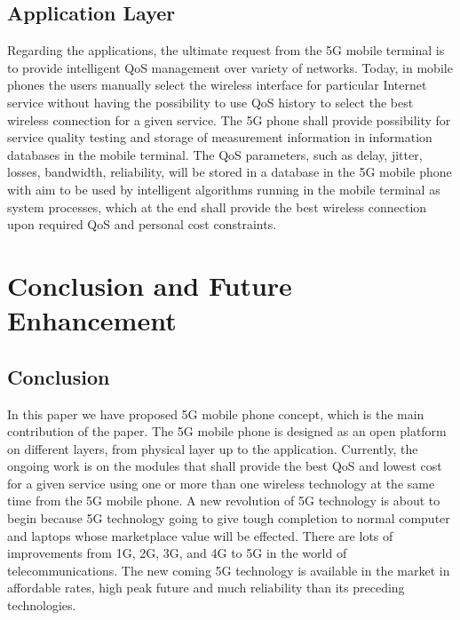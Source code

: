 \documentclass[conference]{IEEEtran}
\begin{document}
\subsection{Application Layer}
     Regarding the applications, the ultimate request from the 5G mobile terminal is to provide intelligent QoS management over variety of networks. Today, in mobile phones the users manually select the wireless interface for particular Internet service without having the possibility to use QoS history to select the best wireless connection for a given service. The 5G phone shall provide possibility for service quality testing and storage of measurement information in information databases in the mobile terminal. The QoS parameters, such as delay, jitter, losses, bandwidth, reliability, will be stored in a database in the 5G mobile phone with aim to be used by intelligent algorithms running in the mobile terminal as system processes, which at the end shall provide the best wireless connection upon required QoS and personal cost constraints.

\section{Conclusion and Future Enhancement}
\subsection{Conclusion}
     In this paper we have proposed 5G mobile phone concept, which is the main contribution of the paper. The 5G mobile phone is designed as an open platform on different layers, from physical layer up to the application. Currently, the ongoing work is on the modules that shall provide the best QoS and lowest cost for a given service using one or more than one wireless technology at the same time from the 5G mobile phone.
     A new revolution of 5G technology is about to begin because 5G technology going to give tough completion to normal computer and laptops whose marketplace value will be effected. There are lots of improvements from 1G, 2G, 3G, and 4G to 5G in the world of telecommunications. The new coming 5G technology is available in the market in affordable rates, high peak future and much reliability than its preceding technologies.
\end{document}
